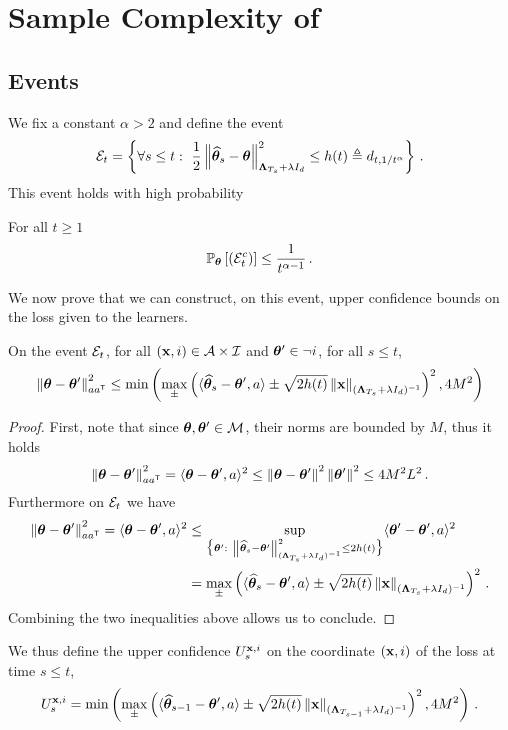 \section{Sample Complexity of \LG{}}\label{app:lgc.proof}

\subsection{Events}\label{app:lgc.proof_nc.events}
We fix a constant $\alpha>2$ and define the event
\[
\cE_t = \left\{\forall s \leq  t:\ \frac{1}{2}\normm{\hbtheta_s-\btheta}^2_{\bLambda_{T_s}+\lambda I_d} \leq h(t)\eqdef d_{t,1/t^\alpha}\right\}\,.
\]
This event holds with high probability
\begin{lemma}
\label{lem:prb_Et_nc}
For all $t \geq 1$
\[
    \mathbb{P}_{\boldsymbol \theta}\left[\left(\mathcal{E}_t^c\right)\right]\leq \frac{1}{t^{\alpha-1}}\,.
\]
\end{lemma}
We now prove that we can construct, on this event, upper confidence bounds on the loss given to the learners.
\begin{lemma}
\label{lem:confidence_bound_general_nc}
On the event $\mathcal{E}_t$, for all $({\bf x},i)\in\mathcal{A}\times\mathcal{I}$ and ${\boldsymbol \theta}'\in\neg i$, for all $s\leq t$,
\[
\left\lVert{\boldsymbol \theta}-{\boldsymbol \theta}'\right\rVert^2_{aa^{\mathsf{\scriptscriptstyle T}}} \leq \min\left(\max_\pm \left( \langle \widehat{{\boldsymbol \theta}}_{s} - {\boldsymbol \theta}',a\rangle \pm \sqrt{2 h(t)} \left\lVert{\bf x}\right\rVert_{({\boldsymbol \Lambda}_{T_s}+ \lambda I_d)^{-1}} \right)^2,4M^2\right)
\]
\end{lemma}
\begin{proof}
First, note that since ${\boldsymbol \theta},{\boldsymbol \theta}'\in\mathcal{M}$, their norms are bounded by $M$, thus it holds
\[
\left\lVert{\boldsymbol \theta}-{\boldsymbol \theta}'\right\rVert^2_{aa^{\mathsf{\scriptscriptstyle T}}} = \langle{\boldsymbol \theta}-{\boldsymbol \theta}',a \rangle^2 \leq \left\lVert{\boldsymbol \theta}-{\boldsymbol \theta}'\right\rVert^2 \left\lVert{\boldsymbol \theta}'\right\rVert^2 \leq 4M^2L^2\,.
\]
Furthermore on $\mathcal{E}_t$ we have
\begin{align*}
\normm{\btheta-\btheta'}^2_{aa^\top} = \langle\btheta-\btheta',a \rangle^2 &\leq \sup_{\big\{\btheta':\ \normm{\hbtheta_s-\btheta'}^2_{(\bLambda_{T_s} + \lambda I_d)^{-1} } \leq 2h(t)\big\}} \langle\btheta'-\btheta',a \rangle^2\\
&=\max_\pm \left( \langle \hbtheta_{s} - \btheta',a\rangle \pm \sqrt{2 h(t)} \normm{\bx}_{(\bLambda_{T_s}+ \lambda I_d)^{-1}} \right)^2\,.
\end{align*}
Combining the two inequalities above allows us to conclude.
\end{proof}
We thus define the upper confidence $U_s^{{\bf x},i}$ on the coordinate $({\bf x},i)$ of the loss at time $s\leq t$,
\begin{equation}
\label{eq:def_ucb_br_general_nc}
U_s^{{\bf x},i} = \min\left(\max_\pm \left( \langle \widehat{{\boldsymbol \theta}}_{s-1} - {\boldsymbol \theta}',a\rangle \pm \sqrt{2 h(t)} \left\lVert{\bf x}\right\rVert_{({\boldsymbol \Lambda}_{T_{s-1}}+ \lambda I_d)^{-1}} \right)^2,4M^2\right)\,.
\end{equation}
